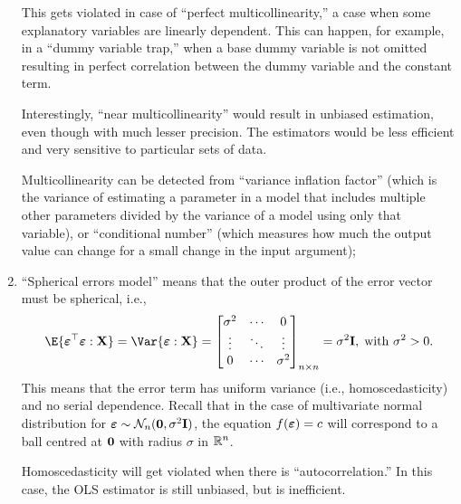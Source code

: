 \begin{enumerate}[(1)]
          This gets violated in case of ``perfect multicollinearity,''
          a case when some explanatory variables are linearly dependent. This
          can happen, for example, in a ``dummy variable trap,''
          when a base dummy variable is not omitted resulting in perfect correlation
          between the dummy variable and the constant term.

          Interestingly, ``near multicollinearity''
          would result in unbiased estimation, even though with much lesser precision.
          The estimators would be less efficient and very sensitive to particular sets of data.

          Multicollinearity can be detected from ``variance inflation factor''
          (which is the variance of estimating a parameter in a model that includes
          multiple other parameters divided by the variance of a model using only that variable),
          or ``conditional number'' (which measures how much the output value can change for a small change
          in the input argument);
    \item ``Spherical errors model'' means that the outer product of the error
          vector must be spherical, i.e.,
          \[ \E{\Vector{\varepsilon}^\top \Vector{\varepsilon}\given \Matrix{X}}
              =\Var{\Vector{\varepsilon}\given \Matrix{X}}=
              \begin{bmatrix}
                  \sigma^2 & \cdots & 0        \\
                  \vdots        & \ddots & \vdots        \\
                  0        & \cdots & \sigma^2
              \end{bmatrix}_{n\times n}=\sigma^2 \Matrix{I},\;\text{with } \sigma^2>0. \]
          This means that the error term has uniform variance (i.e.,
          homoscedasticity) and no serial dependence. Recall
          that in the case of multivariate normal distribution
          for $ {\boldsymbol \varepsilon}\sim\mathcal{N}_n({\boldsymbol 0},\sigma^2 \mathbf{I}) $,
          the equation $ f({\boldsymbol \varepsilon})=c $ will correspond to a ball
          centred at $ {\boldsymbol 0} $ with radius $ \sigma $ in $ \mathbb{R}^n $.

          Homoscedasticity will get violated when there is ``autocorrelation.''
          In this case, the OLS estimator is still unbiased, but is inefficient.


\end{enumerate}
